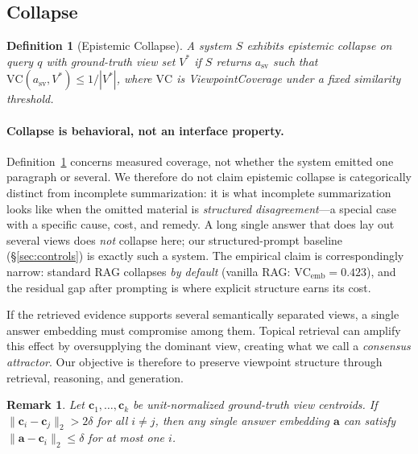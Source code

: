 \documentclass[11pt]{article}
\newtheorem{definition}{Definition}
\newtheorem{remark}{Remark}
\begin{document}
\subsection{Collapse}

\begin{definition}[Epistemic Collapse]
\label{def:collapse}
A system $S$ exhibits \emph{epistemic collapse} on query $q$ with
ground-truth view set $V^*$ if $S$ returns $a_\mathrm{sv}$ such that
$\mathrm{VC}(a_\mathrm{sv}, V^*) \leq 1/|V^*|$, where $\mathrm{VC}$ is
ViewpointCoverage under a fixed similarity threshold.
\end{definition}

\paragraph{Collapse is behavioral, not an interface property.}
Definition~\ref{def:collapse} concerns measured coverage, not whether the
system emitted one paragraph or several.  We therefore do not claim epistemic
collapse is categorically distinct from incomplete summarization: it is what
incomplete summarization looks like when the omitted material is
\emph{structured disagreement}---a special case with a specific cause, cost,
and remedy.  A long single answer that does lay out several views does
\emph{not} collapse here; our structured-prompt baseline
(\S\ref{sec:controls}) is exactly such a system.  The empirical claim is
correspondingly narrow: standard RAG collapses \emph{by default} (vanilla RAG:
$\mathrm{VC}_\text{emb}{=}0.423$), and the residual gap after prompting is
where explicit structure earns its cost.

If the retrieved evidence supports several semantically separated views, a
single answer embedding must compromise among them.  Topical retrieval can
amplify this effect by oversupplying the dominant view, creating what we call a
\emph{consensus attractor}.  Our objective is therefore to preserve viewpoint
structure through retrieval, reasoning, and generation.

\begin{remark}
\label{prop:single-view-bound}
Let $\mathbf{c}_1,\ldots,\mathbf{c}_k$ be unit-normalized ground-truth view
centroids.  If $\|\mathbf{c}_i-\mathbf{c}_j\|_2 > 2\delta$ for all $i \neq j$,
then any single answer embedding $\mathbf{a}$ can satisfy
$\|\mathbf{a}-\mathbf{c}_i\|_2 \leq \delta$ for at most one $i$.
\end{remark}
\end{document}
